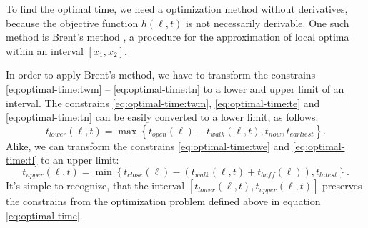  To find the optimal time, we need a optimization method without derivatives, because the objective function $h(\ell, t)$ is not necessarily derivable. One such method is Brent's method \parencite{Brent2002}, a procedure for the approximation of local optima within an interval $[x_1, x_2]$.
 
 In order to apply Brent's method, we have to transform the constrains \eqref{eq:optimal-time:twm} -- \eqref{eq:optimal-time:tn} to a lower and upper limit of an interval.  The constrains \eqref{eq:optimal-time:twm}, \eqref{eq:optimal-time:te} and \eqref{eq:optimal-time:tn} can  be easily converted to a lower limit, as follows: 
  	\begin{equation}\label{eq:lower-limit}
  		t_{lower}(\ell, t) = \max\left\lbrace  t_{open}(\ell)-t_{walk}(\ell, t), t_{now}, t_{earliest} \right\rbrace.
  	\end{equation}
  Alike, we can transform the constrains \eqref{eq:optimal-time:twe} and \eqref{eq:optimal-time:tl} to an upper limit:
  	\begin{equation}\label{eq:upper-limit}
  		t_{upper}(\ell, t) = \min\left\lbrace  t_{close}(\ell)- (t_{walk}(\ell, t) + t_{buff}(\ell)), t_{latest} \right\rbrace.
  	\end{equation}
 It's simple to recognize, that the interval $[t_{lower}(\ell, t), t_{upper}(\ell, t)]$ preserves the constrains from the optimization problem defined above in equation \eqref{eq:optimal-time}.  
 
